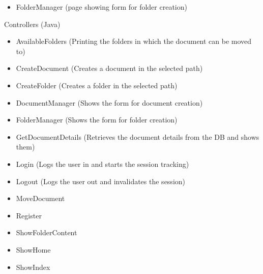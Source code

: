 \documentclass[a4paper,12pt]{article}
\begin{document}
\begin{multicols}{2}
\begin{itemize}
	\item{FolderManager (page showing form for folder creation)}
\end{itemize}
Controllers (Java)
\begin{itemize}
	\item{AvailableFolders} (Printing the folders in which the document can be moved to)
	\item{CreateDocument} (Creates a document in the selected path)
	\item{CreateFolder} (Creates a folder in the selected path)
	\item{DocumentManager} (Shows the form for document creation)
	\item{FolderManager} (Shows the form for folder creation)
	\item{GetDocumentDetails} (Retrieves the document details from the DB and shows them)
	\item{Login} (Logs the user in and starts the session tracking)
	\item{Logout} (Logs the user out and invalidates the session)
	\item{MoveDocument} 
	\item{Register}
	\item{ShowFolderContent} 
	\item{ShowHome}
	\item{ShowIndex}
\end{itemize}
\end{multicols}
\newpage
\end{document}
